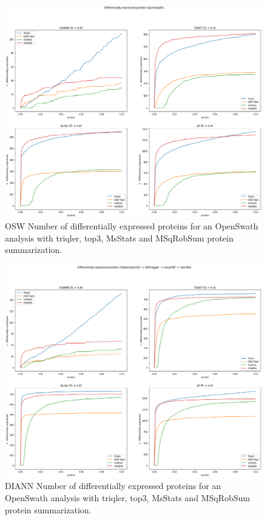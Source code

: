 \documentclass[10pt,letterpaper]{article}
\begin{document}
\begin{figure}[H]
    \centering
    \includegraphics[width=16cm]{../../result/2021-08-13_docs_plots/n_diff_expressed.png}
    \caption{OSW Number of differentially expressed proteins for an OpenSwath analysis with triqler, top3, MsStats and MSqRobSum protein summarization.}
    \label{fig:osw_n_diff_exp}
\end{figure}

\begin{figure}[H]
    \centering
    \includegraphics[width=16cm]{../../result/2021-08-13_docs_plots/DIANN_n_diff_expressed.png}
    \caption{DIANN Number of differentially expressed proteins for an OpenSwath analysis with triqler, top3, MsStats and MSqRobSum protein summarization.}
    \label{fig:DIANN_n_diff_exp}
\end{figure}
\end{document}
